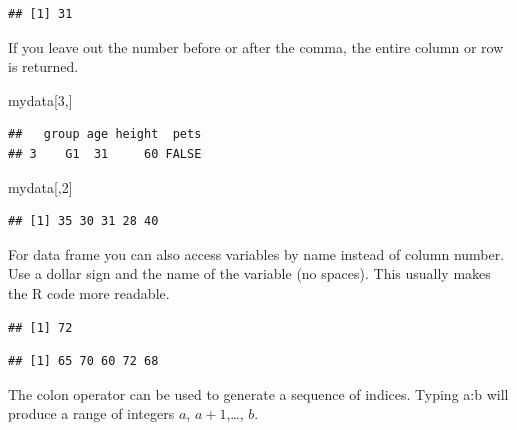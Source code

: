 \documentclass[
]{book}
\newenvironment{Shaded}{\begin{snugshade}}{\end{snugshade}}
\newcommand{\DecValTok}[1]{\textcolor[rgb]{0.00,0.00,0.81}{#1}}
\newcommand{\NormalTok}[1]{#1}
\newcommand{\OperatorTok}[1]{\textcolor[rgb]{0.81,0.36,0.00}{\textbf{#1}}}
\begin{document}
\begin{verbatim}
## [1] 31
\end{verbatim}

If you leave out the number before or after the comma, the entire column or row is returned.

\begin{Shaded}
\begin{Highlighting}[]
\NormalTok{mydata[}\DecValTok{3}\NormalTok{,]}
\end{Highlighting}
\end{Shaded}

\begin{verbatim}
##   group age height  pets
## 3    G1  31     60 FALSE
\end{verbatim}

\begin{Shaded}
\begin{Highlighting}[]
\NormalTok{mydata[,}\DecValTok{2}\NormalTok{]}
\end{Highlighting}
\end{Shaded}

\begin{verbatim}
## [1] 35 30 31 28 40
\end{verbatim}

For data frame you can also access variables by name instead of column number. Use a dollar sign and the name of the variable (no spaces). This usually makes the R code more readable.

\begin{Shaded}
\end{Shaded}

\begin{verbatim}
## [1] 72
\end{verbatim}

\begin{Shaded}
\end{Shaded}

\begin{verbatim}
## [1] 65 70 60 72 68
\end{verbatim}

The colon operator can be used to generate a sequence of indices. Typing a:b will produce a range of integers \(a\), \(a+1\),\ldots, \(b\).
\end{document}
